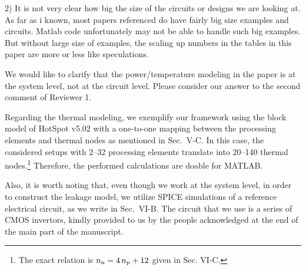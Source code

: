 \begin{reviewer}
2) It is not very clear how big the size of the circuits or designs we are looking at.
As far as i known, most papers referenced do have fairly big size examples and circuits. Matlab code unfortunately may not be able to handle such big examples.
But without large size of examples, the scaling up numbers in the tables in this paper are more or less like speculations.
\end{reviewer}
\begin{authors}
We would like to clarify that the power/temperature modeling in the paper is at the system level, not at the circuit level.
Please consider our answer to the second comment of Reviewer 1.

Regarding the thermal modeling, we exemplify our framework using the block model of HotSpot v5.02 with a one-to-one mapping between the processing elements and thermal nodes as mentioned in Sec.~V-C.
In this case, the considered setups with 2--32 processing elements translate into 20--140 thermal nodes.\footnote{The exact relation is ${n_\text{n}} = 4 \, {n_\text{p}} + 12$ given in Sec. VI-C.}
Therefore, the performed calculations are doable for MATLAB.

Also, it is worth noting that, even though we work at the system level, in order to construct the leakage model, we utilize SPICE simulations of a reference electrical circuit, as we write in Sec.~VI-B.
The circuit that we use is a series of CMOS invertors, kindly provided to us by the people acknowledged at the end of the main part of the manuscript.

\begin{actions}
\end{actions}
\end{authors}

